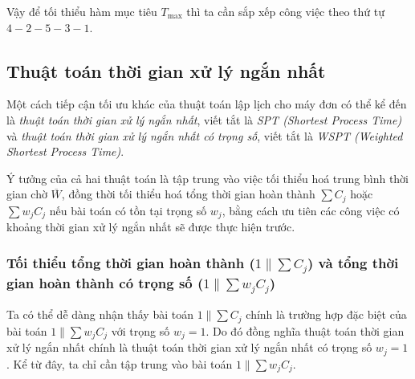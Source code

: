 \documentclass[12pt,a4paper]{report}
\begin{document}
Vậy để tối thiểu hàm mục tiêu $T_{\max}$ thì ta cần sắp xếp công việc theo thứ tự $4-2-5-3-1$.





























































\subsection{Thuật toán thời gian xử lý ngắn nhất}
Một cách tiếp cận tối ưu khác của thuật toán lập lịch cho máy đơn có thể kể đến là \textit{thuật toán thời gian xử lý ngắn nhất}, viết tắt là \textit{SPT (Shortest Process Time)} và \textit{thuật toán thời gian xử lý ngắn nhất có trọng số}, viết tắt là \textit{WSPT (Weighted Shortest Process Time)}.

Ý tưởng của cả hai thuật toán là tập trung vào việc tối thiểu hoá trung bình thời gian chờ $\overline{W}$, đồng thời tối thiểu hoá tổng thời gian hoàn thành $\sum C_j$ hoặc $\sum w_j C_j$ nếu bài toán có tồn tại trọng số $w_j$, bằng cách ưu tiên các công việc có khoảng thời gian xử lý ngắn nhất sẽ được thực hiện trước. 

\subsubsection*{Tối thiểu tổng thời gian hoàn thành ($1 \| \sum C_j$) và tổng thời gian hoàn thành có trọng số ($1 \| \sum w_j C_j$)}
Ta có thể dễ dàng nhận thấy bài toán $1 \| \sum C_j$ chính là trường hợp đặc biệt của bài toán $1 \| \sum w_j C_j$ với trọng số $w_j=1$. Do đó đồng nghĩa thuật toán thời gian xử lý ngắn nhất chính là thuật toán thời gian xử lý ngắn nhất có trọng số $w_j=1$. Kể từ đây, ta chỉ cần tập trung vào bài toán $1\| \sum w_j C_j$.
\end{document}
